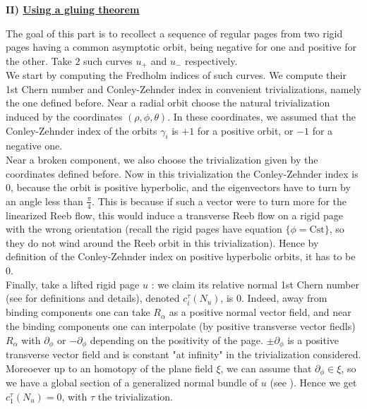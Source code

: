 \documentclass[../main.tex]{subfiles}
\begin{document}
\textbf{II) \underline{Using a gluing theorem}}
\newline

The goal of this part is to recollect a sequence of regular pages from two rigid pages having a common asymptotic orbit, being negative for one and positive for the other. Take $2$ such curves $u_+$ and $u_-$ respectively. \\

We start by computing the Fredholm indices of such curves. We compute their 1st Chern number and Conley-Zehnder index in convenient trivializations, namely the one defined before. Near a radial orbit choose the natural trivialization induced by the coordinates $(\rho,\phi,\theta)$. In these coordinates, we assumed that the Conley-Zehnder index of the orbits $\gamma_i$ is $+1$ for a positive orbit, or $-1$ for a negative one.\\

Near a broken component, we also choose the trivialization given by the coordinates defined before. Now in this trivialization the Conley-Zehnder index is $0$, because the orbit is positive hyperbolic, and the eigenvectors have to turn by an angle less than $\frac{\pi}{4}$. This is because if such a vector were to turn more for the linearized Reeb flow, this would induce a transverse Reeb flow on a rigid page with the wrong orientation (recall the rigid pages have equation $\{\phi = \text{Cst}\}$, so they do not wind around the Reeb orbit in this trivialization). Hence by definition of the Conley-Zehnder index on positive hyperbolic orbits, it has to be $0$.\\
    
Finally, take a lifted rigid page $u$ : we claim its relative normal 1st Chern number (see \cite{wendl_automatic_2009} for definitions and details), denoted $c_i^{\tau}(N_u)$, is $0$. Indeed, away from binding components one can take $R_\alpha$ as a positive normal vector field, and near the binding components one can interpolate (by positive transverse vector fiedls) $R_\alpha$ with $\partial_\phi$ or $-\partial_\phi$ depending on the positivity of the page. $\pm\partial_\phi$ is a positive transverse vector field and is constant "at infinity" in the trivialization considered. Moreoever up to an homotopy of the plane field $\xi$, we can assume that $\partial_\phi\in\xi$, so we have a global section of a generalized normal bundle of $u$ (see \cite{wendl_automatic_2009}). Hence we get $c_1^\tau(N_u) = 0$, with $\tau$ the trivialization.  \\
\end{document}
